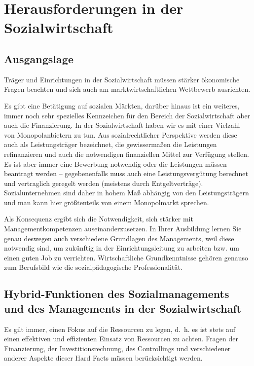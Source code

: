 \documentclass[
  letterpaper,
]{book}
\begin{document}
\section{Herausforderungen in der
Sozialwirtschaft}\label{herausforderungen-sozialwirtschaft}

\subsection{Ausgangslage}\label{sozialwirtschaft-ausgangslage}

Träger und Einrichtungen in der Sozialwirtschaft müssen stärker
ökonomische Fragen beachten und sich auch am marktwirtschaftlichen
Wettbewerb ausrichten.

Es gibt eine Betätigung auf sozialen Märkten, darüber hinaus ist ein
weiteres, immer noch sehr spezielles Kennzeichen für den Bereich der
Sozialwirtschaft aber auch die Finanzierung. In der Sozialwirtschaft
haben wir es mit einer Vielzahl von Monopolanbietern zu tun. Aus
sozialrechtlicher Perspektive werden diese auch als Leistungsträger
bezeichnet, die gewissermaßen die Leistungen refinanzieren und auch die
notwendigen finanziellen Mittel zur Verfügung stellen. Es ist aber immer
eine Bewerbung notwendig oder die Leistungen müssen beantragt werden --
gegebenenfalls muss auch eine Leistungsvergütung berechnet und
vertraglich geregelt werden (meistens durch Entgeltverträge).
Sozialunternehmen sind daher in hohem Maß abhängig von den
Leistungsträgern und man kann hier größtenteils von einem Monopolmarkt
sprechen.

Als Konsequenz ergibt sich die Notwendigkeit, sich stärker mit
Managementkompetenzen auseinanderzusetzen. In Ihrer Ausbildung lernen
Sie genau deswegen auch verschiedene Grundlagen des Managements, weil
diese notwendig sind, um zukünftig in der Einrichtungsleitung zu
arbeiten bzw. um einen guten Job zu verrichten. Wirtschaftliche
Grundkenntnisse gehören genauso zum Berufsbild wie die
sozialpädagogische Professionalität.

\subsection{Hybrid-Funktionen des Sozialmanagements und des Managements
in der Sozialwirtschaft}\label{sozialwirtschat-hybriditaet}

Es gilt immer, einen Fokus auf die Ressourcen zu legen, d.~h. es ist
stets auf einen effektiven und effizienten Einsatz von Ressourcen zu
achten. Fragen der Finanzierung, der Investitionsrechnung, des
Controllings und verschiedener anderer Aspekte dieser Hard Facts müssen
berücksichtigt werden.
\end{document}
